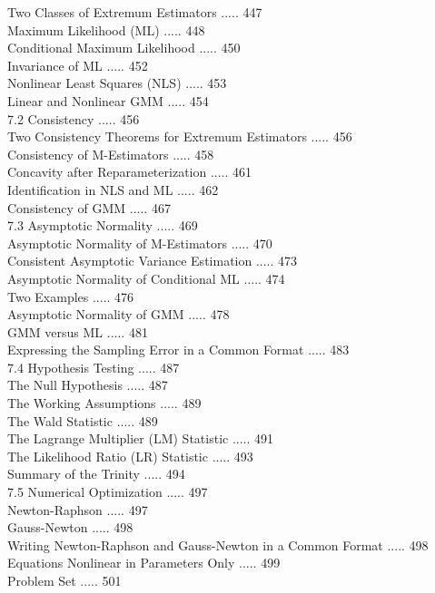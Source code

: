 \documentclass[10pt]{article}
\begin{document}
Two Classes of Extremum Estimators ..... 447\\
Maximum Likelihood (ML) ..... 448\\
Conditional Maximum Likelihood ..... 450\\
Invariance of ML ..... 452\\
Nonlinear Least Squares (NLS) ..... 453\\
Linear and Nonlinear GMM ..... 454\\
7.2 Consistency ..... 456\\
Two Consistency Theorems for Extremum Estimators ..... 456\\
Consistency of M-Estimators ..... 458\\
Concavity after Reparameterization ..... 461\\
Identification in NLS and ML ..... 462\\
Consistency of GMM ..... 467\\
7.3 Asymptotic Normality ..... 469\\
Asymptotic Normality of M-Estimators ..... 470\\
Consistent Asymptotic Variance Estimation ..... 473\\
Asymptotic Normality of Conditional ML ..... 474\\
Two Examples ..... 476\\
Asymptotic Normality of GMM ..... 478\\
GMM versus ML ..... 481\\
Expressing the Sampling Error in a Common Format ..... 483\\
7.4 Hypothesis Testing ..... 487\\
The Null Hypothesis ..... 487\\
The Working Assumptions ..... 489\\
The Wald Statistic ..... 489\\
The Lagrange Multiplier (LM) Statistic ..... 491\\
The Likelihood Ratio (LR) Statistic ..... 493\\
Summary of the Trinity ..... 494\\
7.5 Numerical Optimization ..... 497\\
Newton-Raphson ..... 497\\
Gauss-Newton ..... 498\\
Writing Newton-Raphson and Gauss-Newton in a Common Format ..... 498\\
Equations Nonlinear in Parameters Only ..... 499\\
Problem Set ..... 501\\
\end{document}
